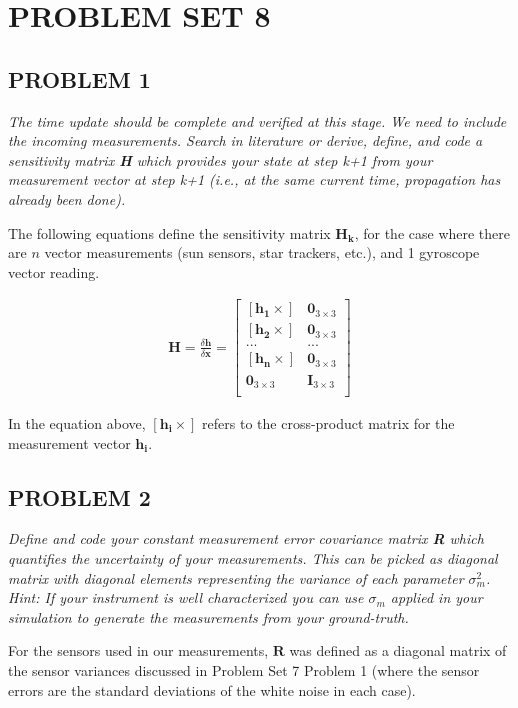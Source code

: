 \section{\Large PROBLEM SET 8}
\subsection{PROBLEM 1}
\textit{The time update should be complete and verified at this stage. We need to include the incoming measurements. Search in literature or derive, define, and code a sensitivity matrix \textbf{H} which provides your state at step k+1 from your measurement vector at step k+1 (i.e., at the same current time, propagation has already been done).}

The following equations define the sensitivity matrix $\mathbf{H_k}$, for the case where there are $n$ vector measurements (sun sensors, star trackers, etc.), and 1 gyroscope vector reading.

\begin{align*}
    \mathbf{H} = \frac{\delta \mathbf{h}}{\delta \mathbf{x}} =
    \begin{bmatrix}
        [\mathbf{h_1} \times] & \mathbf{0}_{3 \times 3} \\
        [\mathbf{h_2} \times] & \mathbf{0}_{3 \times 3} \\
        ... & ... \\
        [\mathbf{h_n} \times] & \mathbf{0}_{3 \times 3} \\
        \mathbf{0}_{3 \times 3} & \mathbf{I}_{3 \times 3} \\
    \end{bmatrix}
\end{align*}

In the equation above, $[\mathbf{h_i} \times]$ refers to the cross-product matrix for the measurement vector $\mathbf{h_i}$.

\subsection{PROBLEM 2}
\textit{Define and code your constant measurement error covariance matrix \textbf{R} which quantifies the uncertainty of your measurements. This can be picked as diagonal matrix with diagonal elements representing the variance of each parameter $\sigma^{2}_{m}$. Hint: If your instrument is well characterized you can use $\sigma_{m}$ applied in your simulation to generate the measurements from your ground-truth.}

For the sensors used in our measurements, $\mathbf{R}$ was defined as a diagonal matrix of the sensor variances discussed in Problem Set 7 Problem 1 (where the sensor errors are the standard deviations of the white noise in each case).

